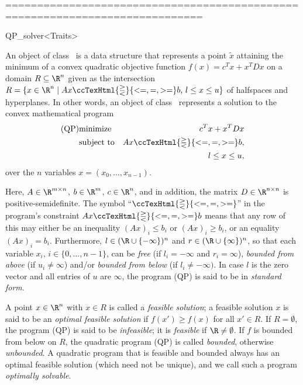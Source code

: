  =============================================================================
\begin{ccRefClass}{QP_solver<Traits>}

\ccDefinition An object of class \ccRefName\ is a data structure
that represents a point $\tilde{x}$ attaining the minimum of a convex
quadratic objective function $f(x)=c^{T}x+x^{T}Dx$ on
a domain $R \subseteq \R^{n}$ given as the intersection $R=\{ x\in\R^n
\mid \mbox{$Ax\ccTexHtml{\gtreqless}{<=,=,>=} b$, $l \le x \le u$}\}$ of halfspaces and
hyperplanes. In other words, an object of class \ccRefName\ represents
a solution to the convex mathematical program
\begin{eqnarray*}
\mbox{(QP)}&\mbox{minimize} & c^{T}x+x^{T}Dx \\
&\mbox{subject to}   & Ax\ccTexHtml{\gtreqless}{<=,=,>=}  b, \\
&& l \leq x \leq u,
\end{eqnarray*}
over the $n$ variables $x=(x_0,\ldots,x_{n-1})$.

Here, $A \in \R^{m \times n}$, $b \in \R^{m}$, $c \in \R^{n}$, and in
addition, the matrix $D \in \R^{n \times n}$ is positive-semidefinite.
The symbol ``$\ccTexHtml{\gtreqless}{<=,=,>=}$'' in the program's constraint $Ax \ccTexHtml{\gtreqless}{<=,=,>=}
b$ means that any row of this may either be an inequality $(Ax)_i \leq b_i$ or
$(Ax)_i \geq b_i$, or an equality $(Ax)_i = b_i$.  Furthermore, $l\in
(\R\cup\{-\infty\})^n$ and $r\in (\R\cup\{\infty\})^n$, so that each
variable $x_i$, $i\in\{0,\ldots,n-1\}$, can be \emph{free} (if
$l_i=-\infty$ and $r_i=\infty$), \emph{bounded from above} (if
$u_i\not=\infty$) and/or \emph{bounded from below} (if
$l_i\not=-\infty)$.  In case $l$ is the zero vector and all entries of
$u$ are $\infty$, the program (QP) is said to be in \emph{standard
form}.

A point $x \in \R^{n}$ with $x\in R$ is called a \emph{feasible
solution}; a feasible solution $x$ is said to be an \emph{optimal
feasible solution} if $f(x')\geq f(x)$ for all $x'\in R$.  If
$R=\emptyset$, the program (QP) is said to be \emph{infeasible};
it is \emph{feasible} if $\R\not=\emptyset$.  If $f$ is bounded from
below on $R$, the quadratic program (QP) is called \emph{bounded},
otherwise \emph{unbounded}.  A quadratic program that is feasible and
bounded always has an optimal feasible solution (which need not be
unique), and we call such a program \emph{optimally solvable}.


\end{ccRefClass}
